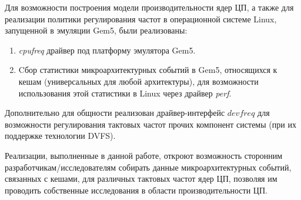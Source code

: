     Для возможности построения модели производительности ядер ЦП, а также для реализации политики
    регулирования частот в операционной системе Linux, запущенной в эмуляции Gem5, были реализованы:
    \begin{enumerate}
        \item \textit{cpufreq} драйвер под платформу эмулятора Gem5.
        \item Cбор статистики микроархитектурных событий в Gem5, относящихся к кешам
        (универсальных для любой архитектуры), для возможности использования этой статистики в Linux
        через драйвер \textit{perf}.
    \end{enumerate}

    Дополнительно для общности реализован драйвер-интерфейс $devfreq$ для возможности регулирования
    тактовых частот прочих компонент системы (при их поддержке технологии DVFS).

    Реализации, выполненные в данной работе, откроют возможность сторонним разработчикам/исследователям
    собирать данные микроархитектурных событий, связанных с кешами, для различных тактовых частот
    ядер ЦП, позволяя им проводить собственные исследования в области производительности ЦП.

\newpage
